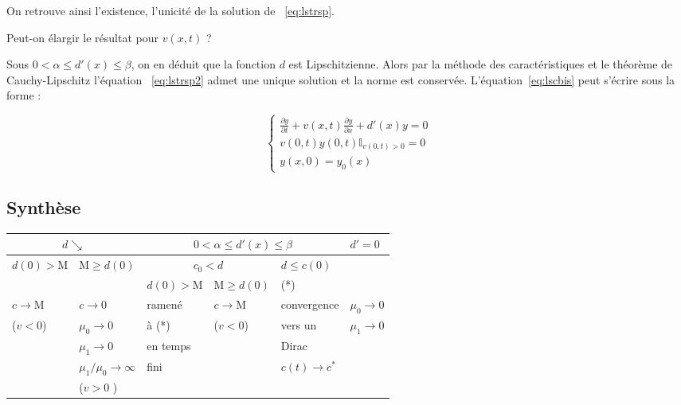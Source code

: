 \documentclass[a4paper]{article}
\theoremstyle{definition}
\theoremstyle{remark}
\newcommand{\mass}{\mathrm{M}}
\newcommand{\dep}{d}
\begin{document}
On retrouve ainsi l'existence, l'unicité de la solution de ~\eqref{eq:lstrsp}.

Peut-on élargir le résultat pour $v(x,t)$ ?

Sous $0 < \alpha \leq \dep' (x) \leq \beta$, on en déduit que la fonction $\dep$ est Lipschitzienne. Alors par la méthode des caractéristiques et le théorème de Cauchy-Lipschitz l'équation ~\eqref{eq:lstrsp2} admet une unique solution et la norme est conservée. L'équation~\eqref{eq:lscbis} peut s'écrire sous la forme :

\begin{equation}
	\label{eq:lstrsp2}
\begin{cases}
	\displaystyle \frac{\partial y}{\partial t}+ v(x,t)\frac{\partial y}{\partial x} + \dep '(x) y = 0 \\
	v(0,t)y(0,t)\mathbb{I}_{v(0,t) > 0} = 0 \\
	y(x,0) = y_0(x)
\end{cases}
\end{equation}





\subsection{Synthèse}

\begin{tabular}{|p{2cm}|p{2cm}| p{2cm}|p{2cm}|p{2cm}|p{2cm}|}
\hline
\multicolumn{2}{|c|}{$\dep \searrow $}&\multicolumn{3}{|c|}{$0<\alpha \leq \dep '(x) \leq \beta$} & $\dep ' = 0$\\
\hline
 $\dep (0)>\mass$ &$\mass \geq \dep(0)$&\multicolumn{2}{|c|}{$c_0 < \dep $} & $ \dep \leq c(0)$&       \\
 \hline 
                  &                    &$\dep (0)>\mass$ &$\mass \geq \dep(0)$ &       (*)  &        \\ 
\hline
\hline
$c\rightarrow \mass$&$c\rightarrow 0 $&   ramené         & $c\rightarrow \mass$ & convergence          & $ \mu_0 \rightarrow 0$ \\ 
 ($v<0 $)          & $ \mu_0 \rightarrow 0$&    à (*)    &  ($v<0 $)            &  vers un             &  $\mu_1 \rightarrow 0$ \\ 
                   & $ \mu_1 \rightarrow 0$& en temps    &                     &     Dirac             &        \\ 
				  & $\mu_1/\mu_0 \rightarrow \infty$&fini &                    &$c(t) \rightarrow c^*$ &        \\ 
				  & ($ v >0 $ )             &             &                    &                       &        \\ 
\hline
\hline
\end{tabular}
\end{document}
